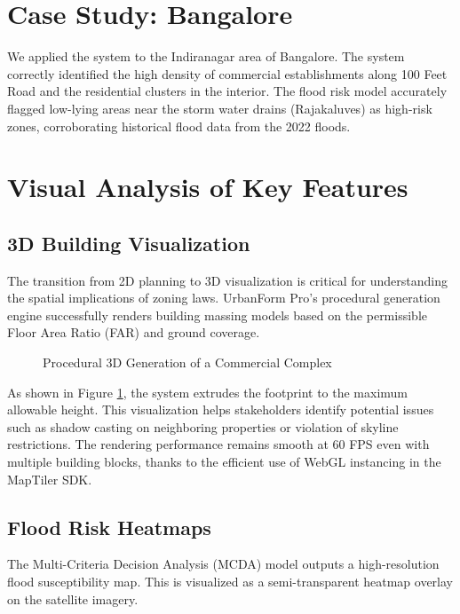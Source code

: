 \documentclass[12pt,a4paper]{report}
\begin{document}
\section{Case Study: Bangalore}
We applied the system to the Indiranagar area of Bangalore. The system correctly identified the high density of commercial establishments along 100 Feet Road and the residential clusters in the interior. The flood risk model accurately flagged low-lying areas near the storm water drains (Rajakaluves) as high-risk zones, corroborating historical flood data from the 2022 floods.

\section{Visual Analysis of Key Features}

\subsection{3D Building Visualization}
The transition from 2D planning to 3D visualization is critical for understanding the spatial implications of zoning laws. UrbanForm Pro's procedural generation engine successfully renders building massing models based on the permissible Floor Area Ratio (FAR) and ground coverage.

\begin{figure}[H]
  \centering
  \caption{Procedural 3D Generation of a Commercial Complex}
  \label{fig:3d-viz}
\end{figure}

As shown in Figure \ref{fig:3d-viz}, the system extrudes the footprint to the maximum allowable height. This visualization helps stakeholders identify potential issues such as shadow casting on neighboring properties or violation of skyline restrictions. The rendering performance remains smooth at 60 FPS even with multiple building blocks, thanks to the efficient use of WebGL instancing in the MapTiler SDK.

\subsection{Flood Risk Heatmaps}
The Multi-Criteria Decision Analysis (MCDA) model outputs a high-resolution flood susceptibility map. This is visualized as a semi-transparent heatmap overlay on the satellite imagery.
\end{document}
